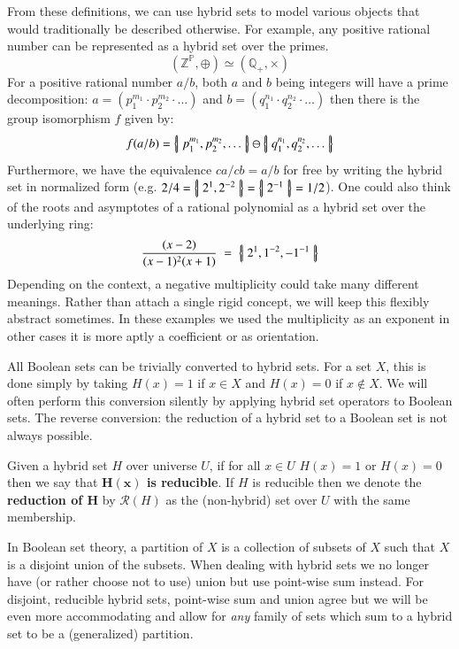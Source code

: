 From these definitions, we can use hybrid sets to model various objects that would traditionally be described otherwise. 
For example, any positive rational number can be represented as a hybrid set over the primes.
\begin{equation*}
	(\mathbb{Z}^\mathbb{P}, \oplus) \simeq (\mathbb{Q}_+,\times)
\end{equation*}
For a positive rational number $a/b$, both $a$ and $b$ being integers will have a prime decomposition: 
$a=(p_1^{m_1}\cdot p_2^{m_2} \cdot \ldots)$ and $b=(q_1^{n_1} \cdot q_2^{n_2} \cdot \ldots)$
then there is the group isomorphism $f$ given by:
\begin{equation*}
	f(a/b) = \left\{ \! \left| \; p_1^{m_1}, p_2^{m_2}, \ldots \; \right| \! \right\} \ominus \left\{ \! \left| \; q_1^{n_1}, q_2^{n_2}, \ldots \; \right| \! \right\}
\end{equation*}
Furthermore, we have the equivalence $ca/cb = a/b$ for free by writing the hybrid set in normalized form
(e.g. $2/4 = \left\{ \! \left| \; 2^1, 2^{-2} \; \right| \! \right\} = \left\{ \! \left| \; 2^{-1} \; \right| \! \right\} = 1/2$).
One could also think of the roots and asymptotes of a rational polynomial as a hybrid set over the underlying ring:
\begin{equation*}
	\frac{(x-2)}{(x-1)^2(x+1)} \;=\; \left\{ \! \left| \;  2^1, 1^{-2}, -1^{-1}  \; \right| \! \right\}
\end{equation*}
Depending on the context, a negative multiplicity could take many different meanings.
Rather than attach a single rigid concept, we will keep this flexibly abstract sometimes.
In these examples we used the multiplicity as an exponent in other cases it is more aptly a coefficient  or as orientation.


All Boolean sets can be trivially converted to hybrid sets.
For a set $X$, this is done simply by taking $H(x)=1$ if $x \in X$ and $H(x)=0$ if $x \notin X$.
We will often perform this conversion silently by applying hybrid set operators to Boolean sets.
The reverse conversion: the reduction of a hybrid set to a Boolean set is not always possible.


\begin{definition}
	Given a hybrid set $H$ over universe $U$, 
	if for all $x \in U$ $H(x)=1$ or $H(x)=0$ then we say that \textbf{$\boldsymbol{H(x)}$ is reducible}.
	If $H$ is reducible then we denote the \textbf{reduction of $\boldsymbol{H}$} by $\mathcal{R}(H)$ 
	as the (non-hybrid) set over $U$ with the same membership.  
\end{definition}


In Boolean set theory, a partition of $X$ is a collection of subsets of $X$ such that $X$ is a disjoint union of the subsets.
When dealing with hybrid sets we no longer have (or rather choose not to use) union but use point-wise sum instead.
For disjoint, reducible hybrid sets, point-wise sum and union agree but we will be even more accommodating 
and allow for \emph{any} family of sets which sum to a hybrid set to be a (generalized) partition.


